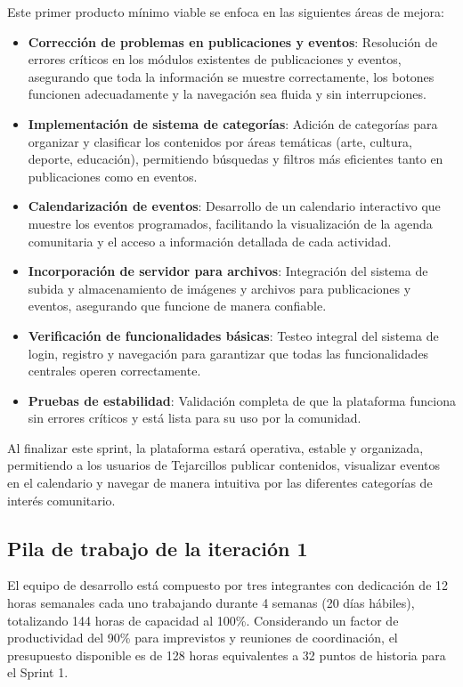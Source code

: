 Este primer producto mínimo viable se enfoca en las siguientes áreas de mejora:

\begin{itemize}
\item \textbf{Corrección de problemas en publicaciones y eventos}: Resolución de errores críticos en los módulos existentes de publicaciones y eventos, asegurando que toda la información se muestre correctamente, los botones funcionen adecuadamente y la navegación sea fluida y sin interrupciones.

\item \textbf{Implementación de sistema de categorías}: Adición de categorías para organizar y clasificar los contenidos por áreas temáticas (arte, cultura, deporte, educación), permitiendo búsquedas y filtros más eficientes tanto en publicaciones como en eventos.

\item \textbf{Calendarización de eventos}: Desarrollo de un calendario interactivo que muestre los eventos programados, facilitando la visualización de la agenda comunitaria y el acceso a información detallada de cada actividad.

\item \textbf{Incorporación de servidor para archivos}: Integración del sistema de subida y almacenamiento de imágenes y archivos para publicaciones y eventos, asegurando que funcione de manera confiable.

\item \textbf{Verificación de funcionalidades básicas}: Testeo integral del sistema de login, registro y navegación para garantizar que todas las funcionalidades centrales operen correctamente.

\item \textbf{Pruebas de estabilidad}: Validación completa de que la plataforma funciona sin errores críticos y está lista para su uso por la comunidad.
\end{itemize}
Al finalizar este sprint, la plataforma estará operativa, estable y organizada, permitiendo a los usuarios de Tejarcillos publicar contenidos, visualizar eventos en el calendario y navegar de manera intuitiva por las diferentes categorías de interés comunitario.

\subsection{Pila de trabajo de la iteración 1}

El equipo de desarrollo está compuesto por tres integrantes con dedicación de 12 horas semanales cada uno trabajando durante 4 semanas (20 días hábiles), totalizando 144 horas de capacidad al 100\%. Considerando un factor de productividad del 90\% para imprevistos y reuniones de coordinación, el presupuesto disponible es de 128 horas equivalentes a 32 puntos de historia para el Sprint 1.

